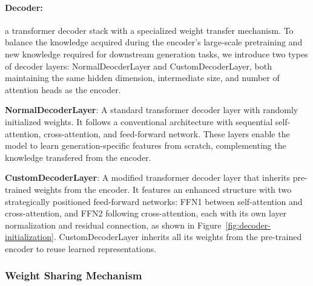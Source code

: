 \paragraph{Decoder:} a transformer decoder stack with a specialized weight transfer mechanism. To balance the knowledge acquired during the encoder's large-scale pretraining and new knowledge required for downstream generation tasks, we introduce two types of decoder layers: NormalDeocderLayer and CustomDecoderLayer, both maintaining the same hidden dimension, intermediate size, and number of attention heads as the encoder.
    
\textbf{NormalDecoderLayer}: A standard transformer decoder layer with randomly initialized weights. It follows a conventional architecture with sequential self-attention, cross-attention, and feed-forward network. These layers enable the model to learn generation-specific features from scratch, complementing the knowledge transfered from the encoder.

\textbf{CustomDecoderLayer}: A modified transformer decoder layer that inherits pre-trained weights from the encoder. It features an enhanced structure with two strategically positioned feed-forward networks: FFN1 between self-attention and cross-attention, and FFN2 following cross-attention, each with its own layer normalization and residual connection, as shown in Figure~\ref{fig:decoder-initialization}. CustomDecoderLayer inherits all its weights from the pre-trained encoder to reuse learned representations. 
 

    
    
\subsubsection{Weight Sharing Mechanism}
    
